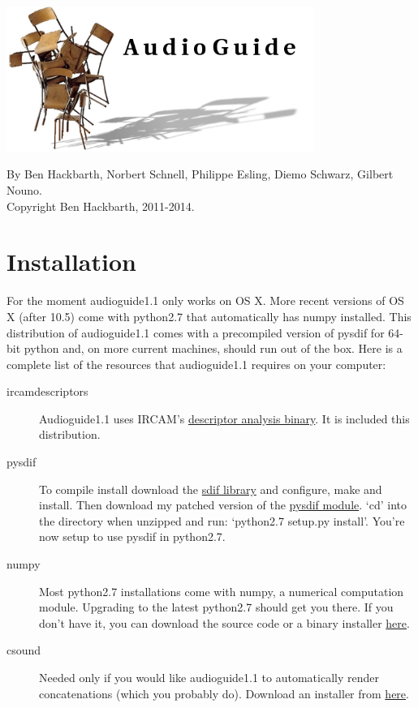 \documentclass{article}
\newcommand{\ag}{audioguide1.1 }
\newcommand{\Ag}{Audioguide1.1 }
\begin{document}
\setlength{\parskip}{10pt}
\begin{spacing}{1.2}
\begin{center}
\includegraphics[width=0.75\textwidth]{image0.png}

By Ben Hackbarth, Norbert Schnell, Philippe Esling, Diemo Schwarz, Gilbert Nouno. \\
Copyright Ben Hackbarth, 2011-2014.
\end{center}

\tableofcontents


\section{Installation}
For the moment \ag only works on OS X.  More recent versions of OS X  (after 10.5) come with python2.7 that automatically has numpy installed.  This distribution of \ag comes with a precompiled version of pysdif for 64-bit python and, on more current machines, should run out of the box.  Here is a complete list of the resources that \ag requires on your computer:
\begin{description}
\item[ircamdescriptors] \Ag uses IRCAM's \href{http://www.ircam.fr/1041.html?&L=1}{descriptor analysis binary}.  It is included this distribution.
\item[pysdif] To compile install download the \href{http://sourceforge.net/projects/sdif/files/sdif/}{sdif library} and configure, make and install.  Then download my patched version of the \href{http://www.benhackbarth.com/\ag/pysdif-0.1.4-patch.zip}{pysdif module}.  `cd' into the directory when unzipped and run: `python2.7 setup.py install'.  You're now setup to use pysdif in python2.7.
\item[numpy] Most python2.7 installations come with numpy, a numerical computation module.  Upgrading to the latest python2.7 should get you there.  If you don't have it, you can download the source code or a binary installer \href{http://www.scipy.org/install.html}{here}.
\item[csound] Needed only if you would like \ag to automatically render concatenations (which you probably do).  Download an installer from \href{http://www.csounds.com/downloads}{here}.


\end{description}
\end{spacing}
\end{document}
